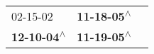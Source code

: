 \begin{supertabular}{lll}
                  02-15-02\textsuperscript{} &  \textbf{11-18-05\textsuperscript{$\wedge$}} \\
 \textbf{12-10-04\textsuperscript{$\wedge$}} &  \textbf{11-19-05\textsuperscript{$\wedge$}} \\
\end{supertabular}
